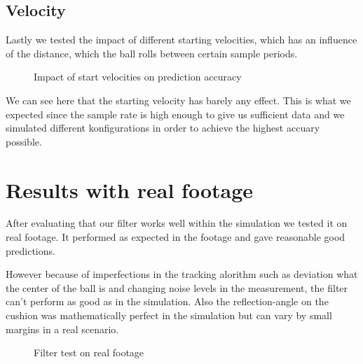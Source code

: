 \documentclass[notitlepage, a4paper, 11pt]{scrartcl}
\begin{document}
\begin{multicols}{2}
\subsection{Velocity}

Lastly we tested the impact of different starting velocities, which has an influence of the distance, which the ball rolls between certain sample periods.

\begin{figure}[H]
    \centering
    \caption{Impact of start velocities on prediction accuracy}
    \label{fig:velocity300}
\end{figure}

We can see here that the starting velocity has barely any effect. 
This is what we expected since the sample rate is high enough to give us sufficient data and we simulated different konfigurations in order to achieve the highest accuary possible.

\section{Results with real footage}

After evaluating that our filter works well within the simulation we tested it on real footage. 
It performed as expected in the footage and gave reasonable good predictions.

However because of imperfections in the tracking alorithm such as deviation what the center of the ball is and changing noise levels in the measurement, 
the filter can't perform as good as in the simulation. Also the reflection-angle on the cushion was mathematically perfect in the simulation
but can vary by small margins in a real scenario.

\begin{figure}[H]
    \centering
    \caption{Filter test on real footage}
    \label{fig:realfootage}
\end{figure}


\end{multicols}
\end{document}

